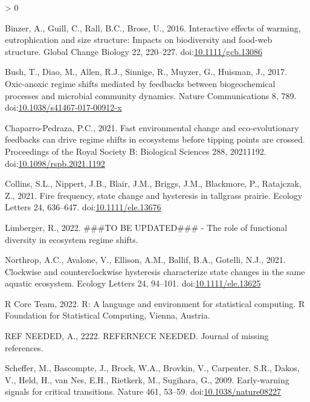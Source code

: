 \documentclass[]{elsarticle} %
\newlength{\cslhangindent}
\newenvironment{CSLReferences}[2] %
 {%
  \setlength{\parindent}{0pt}
  \ifodd #1 \everypar{\setlength{\hangindent}{\cslhangindent}}\ignorespaces\fi
  \ifnum #2 > 0
  \setlength{\parskip}{#2\baselineskip}
  \fi
 }%
 {}
\begin{document}
\hypertarget{refs}{}
\begin{CSLReferences}{1}{0}
\leavevmode\hypertarget{ref-Binzer2016a}{}%
Binzer, A., Guill, C., Rall, B.C., Brose, U., 2016. Interactive effects
of warming, eutrophication and size structure: Impacts on biodiversity
and food-web structure. Global Change Biology 22, 220--227.
doi:\href{https://doi.org/10.1111/gcb.13086}{10.1111/gcb.13086}

\leavevmode\hypertarget{ref-Bush2017}{}%
Bush, T., Diao, M., Allen, R.J., Sinnige, R., Muyzer, G., Huisman, J.,
2017. Oxic-anoxic regime shifts mediated by feedbacks between
biogeochemical processes and microbial community dynamics. Nature
Communications 8, 789.
doi:\href{https://doi.org/10.1038/s41467-017-00912-x}{10.1038/s41467-017-00912-x}

\leavevmode\hypertarget{ref-Chaparro-Pedraza2021}{}%
Chaparro-Pedraza, P.C., 2021. Fast environmental change and
eco-evolutionary feedbacks can drive regime shifts in ecosystems before
tipping points are crossed. Proceedings of the Royal Society B:
Biological Sciences 288, 20211192.
doi:\href{https://doi.org/10.1098/rspb.2021.1192}{10.1098/rspb.2021.1192}

\leavevmode\hypertarget{ref-Collins2021}{}%
Collins, S.L., Nippert, J.B., Blair, J.M., Briggs, J.M., Blackmore, P.,
Ratajczak, Z., 2021. Fire frequency, state change and hysteresis in
tallgrass prairie. Ecology Letters 24, 636--647.
doi:\href{https://doi.org/10.1111/ele.13676}{10.1111/ele.13676}

\leavevmode\hypertarget{ref-Limberger2022}{}%
Limberger, R., 2022. \#\#\#{TO BE UPDATED}\#\#\# - {The} role of
functional diversity in ecosystem regime shifts.

\leavevmode\hypertarget{ref-Northrop2021}{}%
Northrop, A.C., Avalone, V., Ellison, A.M., Ballif, B.A., Gotelli, N.J.,
2021. Clockwise and counterclockwise hysteresis characterize state
changes in the same aquatic ecosystem. Ecology Letters 24, 94--101.
doi:\href{https://doi.org/10.1111/ele.13625}{10.1111/ele.13625}

\leavevmode\hypertarget{ref-RCoreTeam2022}{}%
R Core Team, 2022. R: {A} language and environment for statistical
computing. {R Foundation for Statistical Computing}, {Vienna, Austria}.

\leavevmode\hypertarget{ref-REF_NEEDED}{}%
REF NEEDED, A., 2222. {REFERNECE NEEDED}. Journal of missing references.

\leavevmode\hypertarget{ref-Scheffer2009}{}%
Scheffer, M., Bascompte, J., Brock, W.A., Brovkin, V., Carpenter, S.R.,
Dakos, V., Held, H., van Nes, E.H., Rietkerk, M., Sugihara, G., 2009.
Early-warning signals for critical transitions. Nature 461, 53--59.
doi:\href{https://doi.org/10.1038/nature08227}{10.1038/nature08227}


\end{CSLReferences}
\end{document}
